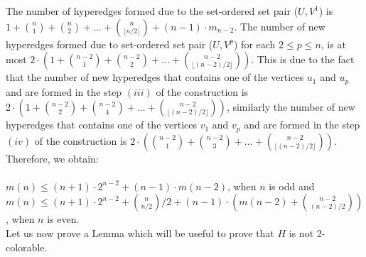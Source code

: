 \documentclass[11pt]{article}
\begin{document}
The number of hyperedges formed due to the set-ordered set pair ($U,V^1$) is $1 + \binom{n}{1} + \binom{n}{2} + \ldots + \binom{n}{\lfloor n/2 \rfloor} + (n-1) \cdot m_{n-2}$. The number of new hyperedges formed due to set-ordered set pair ($U,V^p$) for each $2 \leq p \leq n$, is at most $2\cdot\left(1 + \binom{n-2}{1} + \binom{n-2}{2} + \ldots + \binom{n-2}{\lfloor (n-2)/2 \rfloor} \right)$. This is due to the fact that the number of new hyperedges that contains one of the vertices $u_1$ and $u_p$ and are formed in the step $(iii)$ of the construction is $2\cdot\left(1 + \binom{n-2}{2} + \binom{n-2}{4} + \ldots + \binom{n-2}{\lfloor (n-2)/2 \rfloor} \right)$, similarly the number of new hyperedges that contains one of the vertices $v_1$ and $v_p$ and are formed in the step $(iv)$ of the construction is $2\cdot\left(\binom{n-2}{1} + \binom{n-2}{3} + \ldots + \binom{n-2}{\lfloor (n-2)/2 \rfloor} \right)$. Therefore, we obtain:\\\\
$m(n) \leq (n+1) \cdot 2^{n-2} + (n-1) \cdot m(n-2)$, when $n$ is odd and\\
$m(n) \leq (n+1) \cdot 2^{n-2} + {n \choose {n / 2}}/{2} + (n-1) \cdot
\left( m(n-2) + {n-2 \choose {(n-2)/2}} \right)$, when $n$ is even.\\


\noindent Let us now prove a Lemma which will be useful to prove that $H$ is not 2-colorable.
\end{document}
